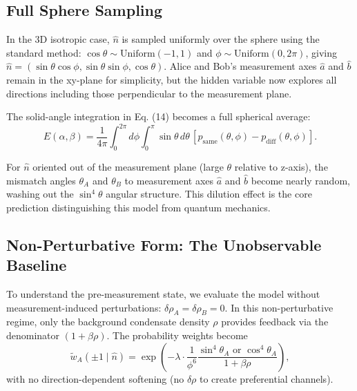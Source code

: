 \subsection*{Full Sphere Sampling}

In the 3D isotropic case, $\hat{n}$ is sampled uniformly over the sphere using the standard method: $\cos\theta \sim \mathrm{Uniform}(-1, 1)$ and $\phi \sim \mathrm{Uniform}(0, 2\pi)$, giving $\hat{n} = (\sin\theta\cos\phi, \sin\theta\sin\phi, \cos\theta)$. Alice and Bob's measurement axes $\hat{a}$ and $\hat{b}$ remain in the xy-plane for simplicity, but the hidden variable now explores all directions including those perpendicular to the measurement plane.

The solid-angle integration in Eq. (14) becomes a full spherical average:
\begin{equation}
E(\alpha, \beta) = \frac{1}{4\pi} \int_0^{2\pi} d\phi \int_0^\pi \sin\theta \, d\theta \, [p_{\mathrm{same}}(\theta, \phi) - p_{\mathrm{diff}}(\theta, \phi)].
\label{P8:eq:E_isotropic}
\end{equation}

For $\hat{n}$ oriented out of the measurement plane (large $\theta$ relative to z-axis), the mismatch angles $\theta_A$ and $\theta_B$ to measurement axes $\hat{a}$ and $\hat{b}$ become nearly random, washing out the $\sin^4\theta$ angular structure. This dilution effect is the core prediction distinguishing this model from quantum mechanics.

\subsection*{Non-Perturbative Form: The Unobservable Baseline}

To understand the pre-measurement state, we evaluate the model without measurement-induced perturbations: $\delta\rho_A = \delta\rho_B = 0$. In this non-perturbative regime, only the background condensate density $\rho$ provides feedback via the denominator $(1 + \beta\rho)$. The probability weights become
\begin{equation}
\tilde{w}_A(\pm 1 \mid \hat{n}) = \exp\left( -\lambda \cdot \frac{1}{\phi^6} \frac{\sin^4\theta_A \text{ or } \cos^4\theta_A}{1 + \beta\rho} \right),
\label{P8:eq:weight_nonperturbative}
\end{equation}
with no direction-dependent softening (no $\delta\rho$ to create preferential channels).

